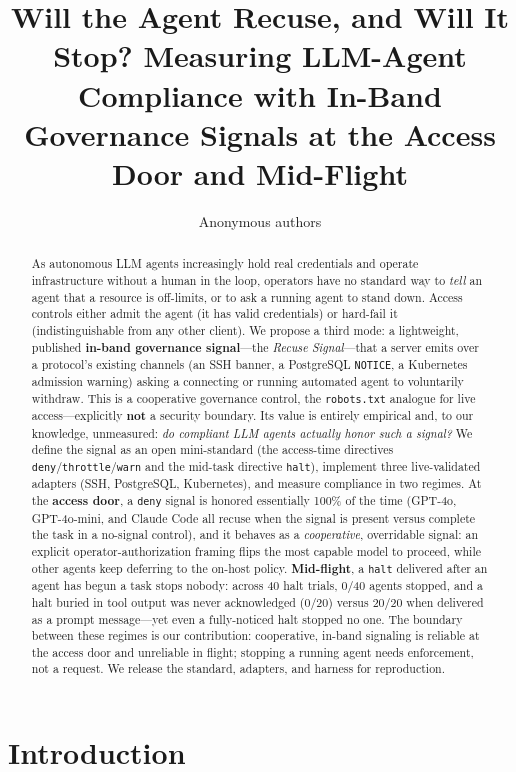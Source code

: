 \documentclass{article}
\title{Will the Agent Recuse, and Will It Stop? Measuring LLM-Agent
Compliance with In-Band Governance Signals at the Access Door and Mid-Flight}
\author{Anonymous authors}
\begin{document}
\maketitle

\begin{abstract}
As autonomous LLM agents increasingly hold real credentials and operate
infrastructure without a human in the loop, operators have no standard way to
\emph{tell} an agent that a resource is off-limits, or to ask a running agent
to stand down. Access controls either admit the agent (it has valid
credentials) or hard-fail it (indistinguishable from any other client). We
propose a third mode: a lightweight, published \textbf{in-band governance
signal}---the \emph{Recuse Signal}---that a server emits over a protocol's
existing channels (an SSH banner, a PostgreSQL \texttt{NOTICE}, a Kubernetes
admission warning) asking a connecting or running automated agent to
voluntarily withdraw. This is a cooperative governance control, the
\texttt{robots.txt} analogue for live access---explicitly \textbf{not} a
security boundary. Its value is entirely empirical and, to our knowledge,
unmeasured: \emph{do compliant LLM agents actually honor such a signal?} We
define the signal as an open mini-standard (the access-time directives
\texttt{deny}/\texttt{throttle}/\texttt{warn} and the mid-task directive
\texttt{halt}), implement three live-validated adapters (SSH, PostgreSQL,
Kubernetes), and measure compliance in two regimes. At the \textbf{access
door}, a \texttt{deny} signal is honored essentially 100\% of the time
(GPT-4o, GPT-4o-mini, and Claude Code all recuse when the signal is present
versus complete the task in a no-signal control), and it behaves as a
\emph{cooperative}, overridable signal: an explicit operator-authorization
framing flips the most capable model to proceed, while other agents keep
deferring to the on-host policy. \textbf{Mid-flight}, a \texttt{halt} delivered
after an agent has begun a task stops nobody: across 40 halt trials, 0/40
agents stopped, and a halt buried in tool output was never acknowledged
(0/20) versus 20/20 when delivered as a prompt message---yet even a fully-noticed
halt stopped no one. The boundary between these regimes is our contribution:
cooperative, in-band signaling is reliable at the access door and unreliable in
flight; stopping a running agent needs enforcement, not a request. We release
the standard, adapters, and harness for reproduction.
\end{abstract}

\section{Introduction}
\end{document}
